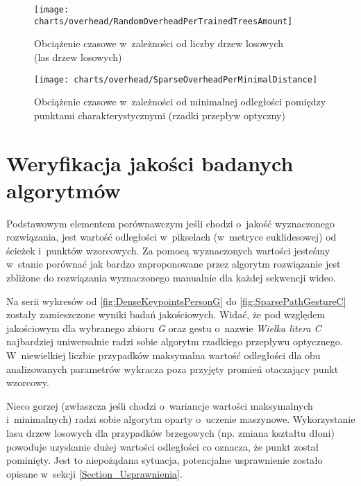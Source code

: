       \begin{figure}[!ht]
        \centering
        \texttt{[image: charts/overhead/RandomOverheadPerTrainedTreesAmount]}
        \caption[Obciążenie czasowe w~zależności od liczby drzew losowych]
                {Obciążenie czasowe w~zależności od liczby drzew losowych\\(las drzew losowych)}
        \label{fig:SpecialisedRandomOverhead}
      \end{figure}

    \newpage
      \begin{figure}[!ht]
        \centering
        \texttt{[image: charts/overhead/SparseOverheadPerMinimalDistance]}
        \caption[Obciążenie czasowe w~zależności od minimalnej odległości pomiędzy punktami charakterystycznymi]
                {Obciążenie czasowe w~zależności od minimalnej odległości pomiędzy punktami charakterystycznymi (rzadki przepływ optyczny)}
        \label{fig:SpecialisedSparseOverhead}
      \end{figure}

  \section{Weryfikacja jakości badanych algorytmów}\label{Section_Quality}

    Podstawowym elementem porównawczym jeśli chodzi o~jakość wyznaczonego rozwiązania, jest wartość odległości w~pikselach (w~metryce euklidesowej) od ścieżek i~punktów wzorcowych. Za pomocą wyznaczonych wartości jesteśmy w~stanie porównać jak bardzo zaproponowane przez algorytm rozwiązanie jest zbliżone do rozwiązania wyznaczonego manualnie dla każdej sekwencji wideo.

    Na serii wykresów od \ref{fig:DenseKeypointsPersonG} do \ref{fig:SparsePathGestureC} zostały zamieszczone wyniki badań jakościowych. Widać, że pod względem jakościowym dla wybranego zbioru \textit{G} oraz gestu o~nazwie \textit{Wielka litera C} najbardziej uniwersalnie radzi sobie algorytm rzadkiego przepływu optycznego. W~niewielkiej liczbie przypadków maksymalna wartość odległości dla obu analizowanych parametrów wykracza poza przyjęty promień otaczający punkt wzorcowy.

    Nieco gorzej (zwłaszcza jeśli chodzi o~wariancje wartości maksymalnych i~minimalnych) radzi sobie algorytm oparty o~uczenie maszynowe. Wykorzystanie lasu drzew losowych dla przypadków brzegowych (np. zmiana kształtu dłoni) powoduje uzyskanie dużej wartości odległości co oznacza, że punkt został pominięty. Jest to niepożądana sytuacja, potencjalne usprawnienie zostało opisane w~sekcji \ref{Section_Usprawnienia}.

